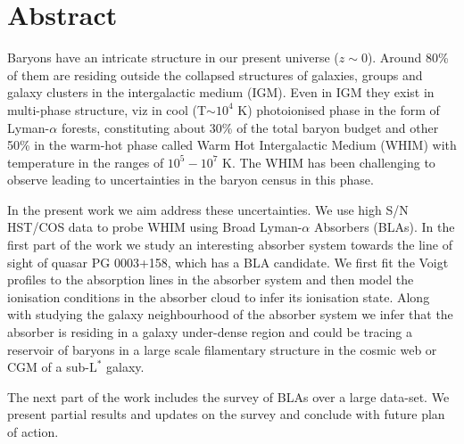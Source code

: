 \chapter*{Abstract}

Baryons have an intricate structure in our present universe ($z\sim 0$). Around 80\% of them are residing outside the collapsed structures of galaxies, groups and galaxy clusters in the intergalactic medium (IGM). Even in IGM they exist in multi-phase structure, viz in cool (T$\sim10^4$ K) photoionised phase in the form of Lyman-$\alpha$ forests, constituting about 30\% of the total baryon budget and other 50\% in the warm-hot phase called Warm Hot Intergalactic Medium (WHIM) with temperature in the ranges of $10^5-10^7$ K. The WHIM has been challenging to observe leading to uncertainties in the baryon census in this phase. 

In the present work we aim address these uncertainties. We use high S/N HST/COS data to probe WHIM using Broad Lyman-$\alpha$ Absorbers (BLAs). In the first part of the work we study an interesting absorber system towards the line of sight of quasar PG 0003+158, which has a BLA candidate. We first fit the Voigt profiles to the absorption lines in the absorber system and then model the ionisation conditions in the absorber cloud to infer its ionisation state. Along with studying the galaxy neighbourhood of the absorber system we infer that the absorber is residing in a galaxy under-dense region and could be tracing a reservoir of baryons in a large scale filamentary structure in the cosmic web or CGM of a sub-$\text{L}^{*}$ galaxy.

The next part of the work includes the survey of BLAs over a large data-set. We present partial results and updates on the survey and conclude with future plan of action.
